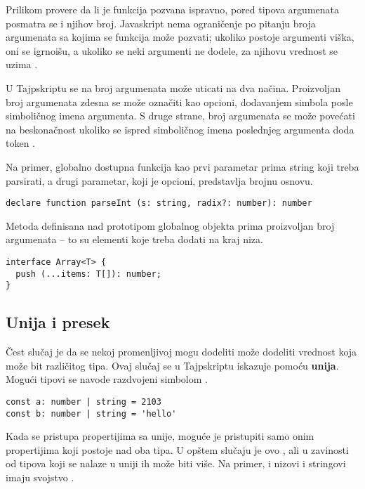 Prilikom provere da li je funkcija pozvana ispravno, pored tipova argumenata posmatra se i njihov broj.
Javaskript nema ograničenje po pitanju broja argumenata sa kojima se funkcija može pozvati; ukoliko postoje argumenti viška, oni se igrnoišu, a ukoliko se neki argumenti ne dodele, za njihovu vrednost se uzima .

U Tajpskriptu se na broj argumenata može uticati na dva načina.
Proizvoljan broj argumenata zdesna se može označiti kao opcioni, dodavanjem simbola  posle simboličnog imena argumenta.
S druge strane, broj argumenata se može povećati na beskonačnost ukoliko se ispred simboličnog imena poslednjeg argumenta doda token .

Na primer, globalno dostupna funkcija  kao prvi parametar prima string koji treba parsirati, a drugi parametar, koji je opcioni, predstavlja brojnu osnovu.

\begin{verbatim}
declare function parseInt (s: string, radix?: number): number
\end{verbatim}

Metoda  definisana nad prototipom globalnog objekta  prima proizvoljan broj argumenata -- to su elementi koje treba dodati na kraj niza.

\begin{verbatim}
interface Array<T> {
  push (...items: T[]): number;
}
\end{verbatim}

\subsection{Unija i presek}

Čest slučaj je da se nekoj promenljivoj mogu dodeliti može dodeliti vrednost koja može bit različitog tipa.
Ovaj slučaj se u Tajpskriptu iskazuje pomoću \textbf{unija}.
Mogući tipovi se navode razdvojeni simbolom \code{|}.

\begin{verbatim}
const a: number | string = 2103
const b: number | string = 'hello'
\end{verbatim}

Kada se pristupa propertijima sa unije, moguće je pristupiti samo onim propertijima koji postoje nad oba tipa.
U opštem slučaju je ovo , ali u zavinosti od tipova koji se nalaze u uniji ih može biti više.
Na primer, i nizovi i stringovi imaju svojstvo .

